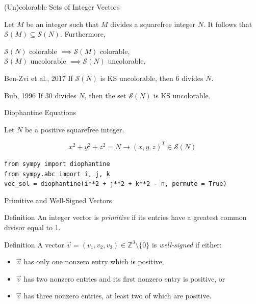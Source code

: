 \documentclass[11pt]{beamer}
\begin{document}
\begin{frame}{(Un)colorable Sets of Integer Vectors}

Let $M$ be an integer such that $M$ divides a squarefree integer $N$. It follows that $\mathcal{S} (M) \subseteq \mathcal{S} (N)$. Furthermore,
\begin{center}
	$\mathcal{S} (N)$ colorable $\implies \mathcal{S} (M)$ colorable, \\
	$\mathcal{S} (M)$ uncolorable $\implies \mathcal{S} (N)$ uncolorable.
\end{center}

\pause

\begin{block}{Ben-Zvi et al., 2017}
	If $\mathcal{S} (N)$ is KS uncolorable, then $6$ divides $N$.
\end{block}

\pause

\begin{block}{Bub, 1996}
	If $30$ divides $N$, then the set $\mathcal{S} (N)$ is KS uncolorable.
\end{block}

\end{frame}
\begin{frame}{Diophantine Equations}

\pause

Let $N$ be a positive squarefree integer.

\[x^{2} + y^{2} + z^{2} = N \rightarrow (x, y, z)^{T} \in \mathcal{S} (N)\]

\pause

\texttt{from sympy import diophantine} \\
\texttt{from sympy.abc import i, j, k} \\
\texttt{vec\_sol = diophantine(i**2 + j**2 + k**2 - n, permute = True)}

\end{frame}
\begin{frame}{Primitive and Well-Signed Vectors}

\begin{block}{Definition}
	An integer vector is \textit{primitive} if its entries have a greatest common divisor equal to 1.
\end{block}

\pause

\begin{block}{Definition}
	A vector $\vec{v} = (v_{1}, v_{2}, v_{3}) \in \mathbb{Z}^{3} \setminus \{0\}$ is \textit{well-signed} if either:
	\begin{itemize}
		\item $\vec{v}$ has only one nonzero entry which is positive,
		\item $\vec{v}$ has two nonzero entries and its first nonzero entry is positive, or
		\item $\vec{v}$ has three nonzero entries, at least two of which are positive.
	\end{itemize}
\end{block}

\end{frame}
\end{document}
